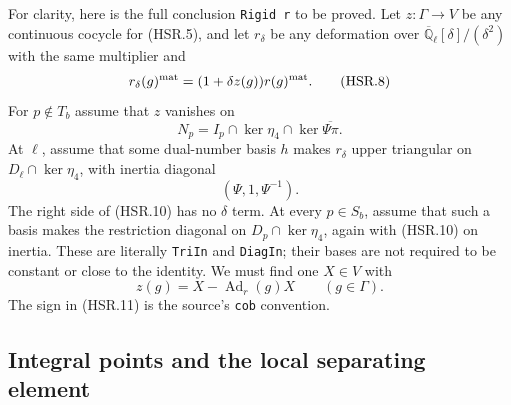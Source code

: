 \documentclass[11pt,a4paper]{article}
\numberwithin{equation}{section}
\theoremstyle{remark}\newtheorem{remark}[theorem]{Remark}
\begin{document}
For clarity, here is the full conclusion \texttt{Rigid r} to be
proved.  Let $z:\Gamma\to V$ be any continuous cocycle for (HSR.5),
and let $r_\delta$ be any deformation over
$\overline{\mathbb Q}_\ell[\delta]/(\delta^2)$ with the same
multiplier and
\[
 r_\delta(g)^{\rm mat}=(1+\delta z(g))r(g)^{\rm mat}.
 \tag{HSR.8}
\]
For $p\notin T_b$ assume that $z$ vanishes on
\[
 N_p=I_p\cap\ker\eta_4\cap\ker\overline{\Psi\pi}.
 \tag{HSR.9}
\]
At $\ell$, assume that some dual-number basis $h$ makes $r_\delta$
upper triangular on $D_\ell\cap\ker\eta_4$, with inertia diagonal
\[
                  (\Psi,1,\Psi^{-1}).
 \tag{HSR.10}
\]
The right side of (HSR.10) has no $\delta$ term.  At every
$p\in S_b$, assume that such a basis makes the restriction diagonal
on $D_p\cap\ker\eta_4$, again with (HSR.10) on inertia.  These
are literally \texttt{Tri\allowbreak In} and \texttt{Diag\allowbreak In}; their bases are
not required to be constant or close to the identity.  We must find
one $X\in V$ with
\[
                  z(g)=X-\operatorname{Ad}_r(g)X
                  \qquad(g\in\Gamma).
 \tag{HSR.11}
\]
The sign in (HSR.11) is the source's \texttt{cob} convention.

\subsection{Integral points and the local separating element}
\end{document}
